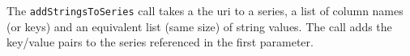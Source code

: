 The \verb+addStringsToSeries+ call takes a the uri to a series, a list of column names (or keys) and an equivalent
list (same size) of string values. The call adds the key/value pairs to the series referenced in the first parameter.
